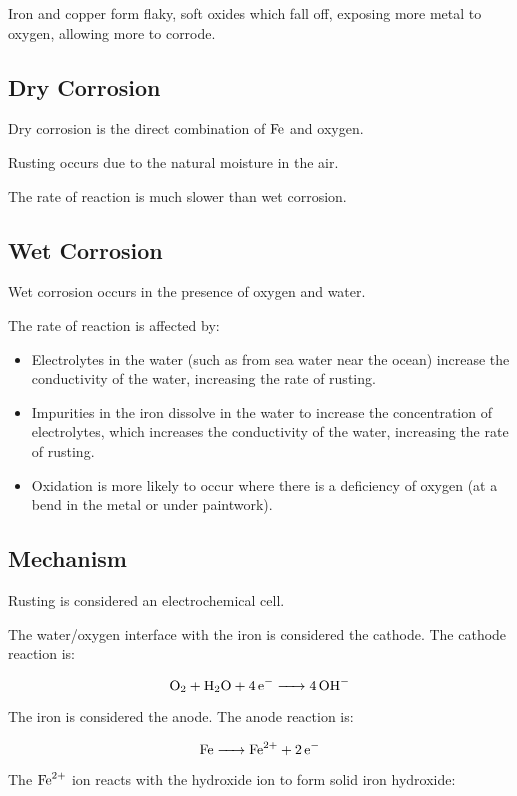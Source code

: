 \documentclass[a4paper,11pt]{article}
\begin{document}
Iron and copper form flaky, soft oxides which fall off, exposing more metal to
oxygen, allowing more to corrode.

\subsection{Dry Corrosion}

Dry corrosion is the direct combination of $\ce{Fe}$ and oxygen.

Rusting occurs due to the natural moisture in the air.

The rate of reaction is much slower than wet corrosion.

\subsection{Wet Corrosion}

Wet corrosion occurs in the presence of oxygen and water.

The rate of reaction is affected by:

\begin{itemize}
\item Electrolytes in the water (such as from sea water near the ocean)
	increase the conductivity of the water, increasing the rate of rusting.
\item Impurities in the iron dissolve in the water to increase the concentration
	of electrolytes, which increases the conductivity of the water, increasing
	the rate of rusting.
\item Oxidation is more likely to occur where there is a deficiency of oxygen
	(at a bend in the metal or under paintwork).
\end{itemize}

\subsection{Mechanism}

Rusting is considered an electrochemical cell.

The water/oxygen interface with the iron is considered the cathode. The cathode
reaction is:

$$
\ce{O2 + H2O + 4e- -> 4OH-}
$$

The iron is considered the anode. The anode reaction is:

$$
\ce{Fe -> Fe^{2+} + 2e-}
$$

The $\ce{Fe^{2+}}$ ion reacts with the hydroxide ion to form solid iron
hydroxide:
\end{document}
